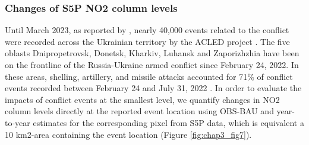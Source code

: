 \subsubsection*{Changes of S5P NO2 column levels}
Until March 2023, as reported by \citep{nichita2023}, nearly 40,000 events related to the conflict were recorded across the Ukrainian territory by the ACLED project \citep{raleigh2010introducing}. The five oblasts Dnipropetrovsk, Donetsk, Kharkiv, Luhansk and Zaporizhzhia have been on the frontline of the Russia-Ukraine armed conflict since February 24, 2022. In these areas, shelling, artillery, and missile attacks accounted for 71\% of conflict events recorded between February 24 and July 31, 2022 \citep{nichita2023}. In order to evaluate the impacts of conflict events at the smallest level, we quantify changes in NO2 column levels directly at the reported event location using OBS-BAU and year-to-year estimates for the corresponding pixel from S5P data, which is equivalent a 10 km2-area containing the event location (Figure \ref{fig:chap3_fig7}). \par

